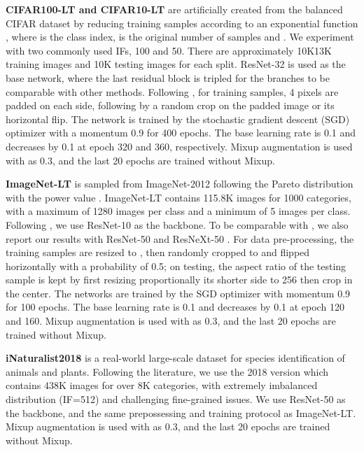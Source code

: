 \documentclass[10pt,twocolumn,letterpaper]{article}
\begin{document}
\textbf{CIFAR100-LT and CIFAR10-LT} \cite{cui2019class} are artificially created from the balanced CIFAR dataset \cite{krizhevsky2009learning} by reducing training samples according to an exponential function , where  is the class index,  is the original number of samples and . We experiment with two commonly used IFs, 100 and 50. There are approximately 10K13K training images and 10K testing images for each split. ResNet-32 is used as the base network, where the last residual block is tripled for the branches to be comparable with other methods. Following \cite{he2016deep}, for training samples, 4 pixels are padded on each side, following by a  random crop on the padded image or its horizontal flip. The network is trained by the stochastic gradient descent (SGD) optimizer with a momentum 0.9 for 400 epochs. The base learning rate is 0.1 and decreases by 0.1 at epoch 320 and 360, respectively. Mixup \cite{zhang2017mixup} augmentation is used with  as 0.3, and the last 20 epochs are trained without Mixup.

 \textbf{ImageNet-LT} \cite{liu2019large} is sampled from ImageNet-2012 \cite{deng2009imagenet} following the Pareto distribution with the power value . ImageNet-LT contains 115.8K images for 1000 categories, with a maximum of 1280 images per class and a minimum of 5 images per class. Following \cite{liu2019large, kang2019decoupling, xiang2020learning, zhang2021bag}, we use ResNet-10 as the backbone. To be comparable with \cite{kang2019decoupling,wang2020long}, we also report our results with ResNet-50 and ResNeXt-50 \cite{xie2017aggregated}. For data pre-processing, the training samples are resized to , then randomly cropped to  and flipped horizontally with a probability of 0.5; on testing, the aspect ratio of the testing sample is kept by first resizing proportionally its shorter side to 256 then crop  in the center. The networks are trained by the SGD optimizer with momentum 0.9 for 100 epochs. The base learning rate is 0.1 and decreases by 0.1 at epoch 120 and 160. Mixup augmentation is used with  as 0.3, and the last 20 epochs are trained without Mixup.
 
\textbf{iNaturalist2018} \cite{van2018inaturalist} is a real-world large-scale dataset for species identification of animals and plants. Following the literature, we use the 2018 version which contains 438K images for over 8K categories, with extremely imbalanced distribution (IF=512) and challenging fine-grained issues. We use ResNet-50 as the backbone, and the same prepossessing and training protocol as ImageNet-LT. Mixup augmentation is used with  as 0.3, and the last 20 epochs are trained without Mixup.
\end{document}
